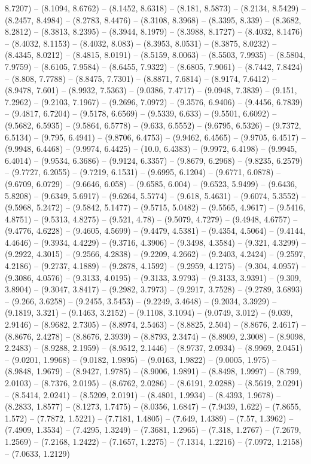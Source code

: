 8.7207) -- (8.1094, 8.6762) -- (8.1452, 8.6318) -- (8.181, 8.5873) -- (8.2134, 8.5429) -- (8.2457, 8.4984) -- (8.2783, 8.4476) -- (8.3108, 8.3968) -- (8.3395, 8.339) -- (8.3682, 8.2812) -- (8.3813, 8.2395) -- (8.3944, 8.1979) -- (8.3988, 8.1727) -- (8.4032, 8.1476) -- (8.4032, 8.1153) -- (8.4032, 8.083) -- (8.3953, 8.0531) -- (8.3875, 8.0232) -- (8.4345, 8.0212) -- (8.4815, 8.0191) -- (8.5159, 8.0063) -- (8.5503, 7.9935) -- (8.5804, 7.9759) -- (8.6105, 7.9584) -- (8.6455, 7.9322) -- (8.6805, 7.9061) -- (8.7442, 7.8424) -- (8.808, 7.7788) -- (8.8475, 7.7301) -- (8.8871, 7.6814) -- (8.9174, 7.6412) -- (8.9478, 7.601) -- (8.9932, 7.5363) -- (9.0386, 7.4717) -- (9.0948, 7.3839) -- (9.151, 7.2962) -- (9.2103, 7.1967) -- (9.2696, 7.0972) -- (9.3576, 6.9406) -- (9.4456, 6.7839) -- (9.4817, 6.7204) -- (9.5178, 6.6569) -- (9.5339, 6.633) -- (9.5501, 6.6092) -- (9.5682, 6.5935) -- (9.5864, 6.5778) -- (9.633, 6.5552) -- (9.6795, 6.5326) -- (9.7372, 6.5134) -- (9.795, 6.4941) -- (9.8706, 6.4753) -- (9.9462, 6.4565) -- (9.9705, 6.4517) -- (9.9948, 6.4468) -- (9.9974, 6.4425) -- (10.0, 6.4383) -- (9.9972, 6.4198) -- (9.9945, 6.4014) -- (9.9534, 6.3686) -- (9.9124, 6.3357) -- (9.8679, 6.2968) -- (9.8235, 6.2579) -- (9.7727, 6.2055) -- (9.7219, 6.1531) -- (9.6995, 6.1204) -- (9.6771, 6.0878) -- (9.6709, 6.0729) -- (9.6646, 6.058) -- (9.6585, 6.004) -- (9.6523, 5.9499) -- (9.6436, 5.8208) -- (9.6349, 5.6917) -- (9.6264, 5.5774) -- (9.618, 5.4631) -- (9.6074, 5.3552) -- (9.5968, 5.2472) -- (9.5842, 5.1477) -- (9.5715, 5.0482) -- (9.5565, 4.9617) -- (9.5416, 4.8751) -- (9.5313, 4.8275) -- (9.521, 4.78) -- (9.5079, 4.7279) -- (9.4948, 4.6757) -- (9.4776, 4.6228) -- (9.4605, 4.5699) -- (9.4479, 4.5381) -- (9.4354, 4.5064) -- (9.4144, 4.4646) -- (9.3934, 4.4229) -- (9.3716, 4.3906) -- (9.3498, 4.3584) -- (9.321, 4.3299) -- (9.2922, 4.3015) -- (9.2566, 4.2838) -- (9.2209, 4.2662) -- (9.2403, 4.2424) -- (9.2597, 4.2186) -- (9.2737, 4.1889) -- (9.2878, 4.1592) -- (9.2959, 4.1275) -- (9.304, 4.0957) -- (9.3086, 4.0576) -- (9.3133, 4.0195) -- (9.3133, 3.9793) -- (9.3133, 3.9391) -- (9.309, 3.8904) -- (9.3047, 3.8417) -- (9.2982, 3.7973) -- (9.2917, 3.7528) -- (9.2789, 3.6893) -- (9.266, 3.6258) -- (9.2455, 3.5453) -- (9.2249, 3.4648) -- (9.2034, 3.3929) -- (9.1819, 3.321) -- (9.1463, 3.2152) -- (9.1108, 3.1094) -- (9.0749, 3.012) -- (9.039, 2.9146) -- (8.9682, 2.7305) -- (8.8974, 2.5463) -- (8.8825, 2.504) -- (8.8676, 2.4617) -- (8.8676, 2.4278) -- (8.8676, 2.3939) -- (8.8793, 2.3474) -- (8.8909, 2.3008) -- (8.9098, 2.2483) -- (8.9288, 2.1959) -- (8.9512, 2.1446) -- (8.9737, 2.0934) -- (8.9969, 2.0451) -- (9.0201, 1.9968) -- (9.0182, 1.9895) -- (9.0163, 1.9822) -- (9.0005, 1.975) -- (8.9848, 1.9679) -- (8.9427, 1.9785) -- (8.9006, 1.9891) -- (8.8498, 1.9997) -- (8.799, 2.0103) -- (8.7376, 2.0195) -- (8.6762, 2.0286) -- (8.6191, 2.0288) -- (8.5619, 2.0291) -- (8.5414, 2.0241) -- (8.5209, 2.0191) -- (8.4801, 1.9934) -- (8.4393, 1.9678) -- (8.2833, 1.8577) -- (8.1273, 1.7475) -- (8.0356, 1.6847) -- (7.9439, 1.622) -- (7.8655, 1.572) -- (7.7872, 1.5221) -- (7.7181, 1.4805) -- (7.649, 1.4389) -- (7.57, 1.3962) -- (7.4909, 1.3534) -- (7.4295, 1.3249) -- (7.3681, 1.2965) -- (7.318, 1.2767) -- (7.2679, 1.2569) -- (7.2168, 1.2422) -- (7.1657, 1.2275) -- (7.1314, 1.2216) -- (7.0972, 1.2158) -- (7.0633, 1.2129) 